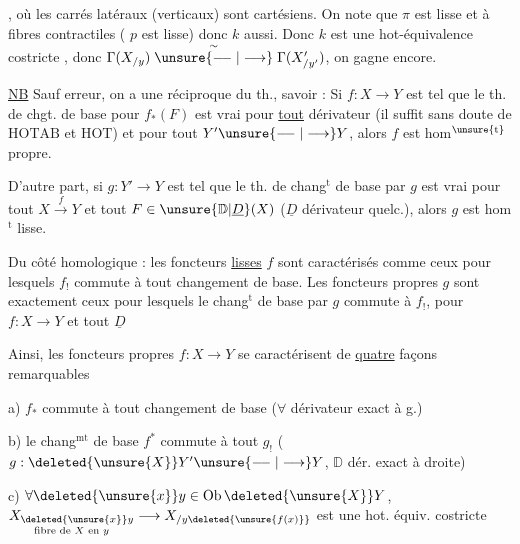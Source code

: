 , où les  carrés latéraux (verticaux) sont cartésiens. On note que $\pi$ est lisse et à fibres contractiles ( $p$ est lisse) donc $k$ aussi.  Donc $k$ est une hot-équivalence    \unsure{$=$} costricte , donc $\Gamma(X_{/y})\mathrel{\overset{\sim}{\unsure{\relbar\joinrel\relbar|\longrightarrow}}}\Gamma(X'_{/y'})$, on gagne encore.

\uline{NB} Sauf erreur, on a une réciproque du th., savoir : Si $f:X\longrightarrow Y$ est tel que le th. de chgt. de base pour $f_*(F)$ est vrai pour \uline{tout} dérivateur (il suffit sans doute de $\mathrm{HOTAB}$ et $\mathrm{HOT}$) et pour tout $Y'\unsure{\relbar\joinrel\relbar|\longrightarrow}Y$, alors $f$ est hom$^{\unsure{\mathrm t}}$ propre.

D'autre part, si $g:Y'\longrightarrow Y$ est tel que le th. de chang$^{\mathrm t}$ de base par $g$ est vrai pour tout $X\xrightarrow{f}Y$ et tout $F\in\unsure{\mathbb D|\underline D}(X)$ ($\underline D$ dérivateur  quelc.), alors $g$ est hom$^{\mathrm t}$ lisse.

Du côté homologique : les foncteurs \uline{lisses} $f$ sont caractérisés comme ceux pour lesquels  $f_!$ commute à tout changement de base. Les foncteurs propres $g$ sont exactement ceux pour lesquels le chang$^{\mathrm t}$ de base par $g$ commute à $f_!$, pour   $f:X\longrightarrow Y$ et tout $\underline D$ 

Ainsi, les foncteurs propres $f:X\longrightarrow Y$ se caractérisent de \uline{quatre} façons remarquables

a) $f_*$ commute à tout changement de base ($\forall$ dérivateur  exact à g.)

b) le chang$^{\mathrm{mt}}$ de base $f^*$ commute à tout $g_!$ ($g:\deleted{\unsure{X}}Y'\unsure{\relbar\joinrel\relbar|\longrightarrow}Y$, $\mathbb D$ dér. exact à droite)

c) $\forall\deleted{\unsure{x}}y\in\mathrm{Ob}\,\deleted{\unsure{X}}Y$, $\underset{\text{fibre de }X\text{ en }y}{X_{\deleted{\unsure{x}}y}}\longrightarrow X_{/y\deleted{\unsure{f(x)}}}$ est une hot. équiv. costricte 

